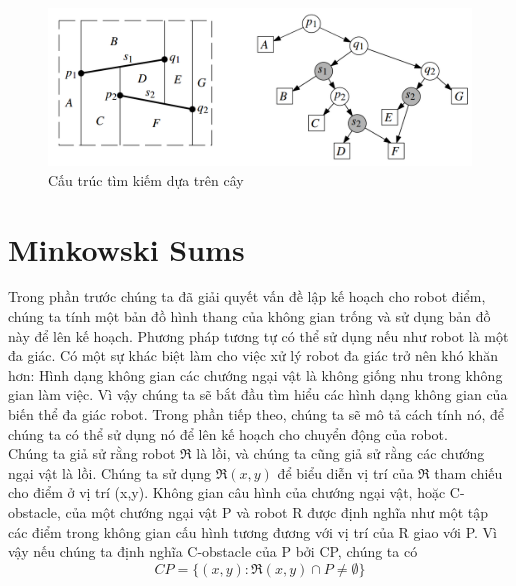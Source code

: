 \documentclass[a4paper,12pt]{report}
\begin{document}
\begin{figure}[H]
\label{object_pic}
\centering
\includegraphics[scale=0.4]{trmap3.png}
\caption{Cấu trúc tìm kiếm dựa trên cây}

\end{figure}


\section{Minkowski Sums}
Trong phần trước chúng ta đã giải quyết vấn đề lập kế hoạch cho robot điểm, chúng ta tính một bản đồ hình thang của không gian trống và sử dụng bản đồ này để lên kế hoạch. Phương pháp tương tự có thể sử dụng nếu như robot là một đa giác. Có một sự khác biệt làm cho việc xử lý robot đa giác trở nên khó khăn hơn: Hình dạng không gian các chướng ngại vật là không giống nhu trong không gian làm việc. Vì vậy chúng ta sẽ bắt đầu tìm hiểu các hình dạng không gian của biến thể đa giác robot. Trong phần tiếp theo, chúng ta sẽ mô tả cách tính nó, để chúng ta có thể sử dụng nó để lên kế hoạch cho chuyển động của robot.
\\
Chúng ta giả sử rằng robot $\Re$ là lồi, và chúng ta cũng giả sử rằng các chướng ngại vật là lồi. Chúng ta sử dụng $\Re(x,y)$ để biểu diễn vị trí của $\Re$ tham chiếu cho điểm ở vị trí (x,y). Không gian câu hình của chướng ngại vật, hoặc C-obstacle, của một chướng ngại vật   P và robot R được định nghĩa như một tập các điểm trong không gian cấu hình tương  đương với vị trí của R giao với P. Vì vậy nếu chúng ta định nghĩa C-obstacle của P bởi CP, chúng ta có
\begin{displaymath}
CP = \{(x,y): \Re(x,y)\cap P \neq \emptyset \}
\end{displaymath}
\end{document}
